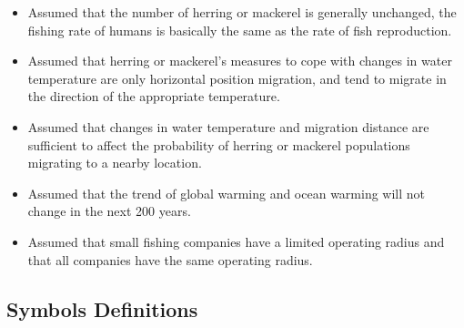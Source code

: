\documentclass{mcmthesis}
\numberwithin{figure}{section}
\numberwithin{table}{section}
\begin{document}
\begin{itemize}
\item Assumed that the number of herring or mackerel is generally unchanged, the fishing rate of humans is basically the same as the rate of fish reproduction.
\item Assumed that herring or mackerel's measures to cope with changes in water temperature are only horizontal position migration, and tend to migrate in the direction of the appropriate temperature.

\item Assumed that changes in water temperature and migration distance are sufficient to affect the probability of herring or mackerel populations migrating to a nearby location.

\item Assumed that the trend of global warming and ocean warming will not change in the next 200 years.

\item Assumed that small fishing companies have a limited operating radius and that all companies have the same operating radius.

\end{itemize}

\subsection{Symbols Definitions}
\end{document}
